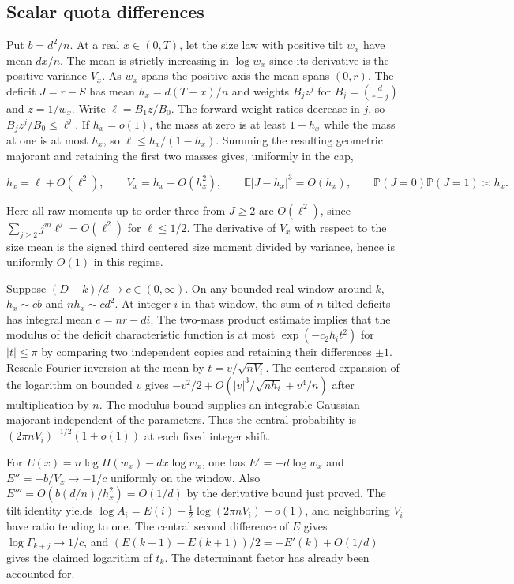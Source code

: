 \subsection{Scalar quota differences}

Put $b=d^2/n$. At a real $x\in(0,T)$, let the size law with positive tilt $w_x$ have mean $dx/n$. The mean is strictly increasing in $\log w_x$ since its derivative is the positive variance $V_x$. As $w_x$ spans the positive axis the mean spans $(0,r)$. The deficit $J=r-S$ has mean $h_x=d(T-x)/n$ and weights $B_j z^j$ for $B_j=\binom d{r-j}$ and $z=1/w_x$. Write $\ell=B_1z/B_0$. The forward weight ratios decrease in $j$, so $B_j z^j/B_0\le\ell^j$. If $h_x=o(1)$, the mass at zero is at least $1-h_x$ while the mass at one is at most $h_x$, so $\ell\le h_x/(1-h_x)$. Summing the resulting geometric majorant and retaining the first two masses gives, uniformly in the cap,

\begin{equation*}
h_x=\ell+O(\ell^2),\qquad
V_x=h_x+O(h_x^2),\qquad
\mathbb E|J-h_x|^3=O(h_x),\qquad
\mathbb P(J=0)\mathbb P(J=1)\asymp h_x.
\end{equation*}

Here all raw moments up to order three from $J\ge2$ are $O(\ell^2)$, since $\sum_{j\ge2}j^m\ell^j=O(\ell^2)$ for $\ell\le1/2$. The derivative of $V_x$ with respect to the size mean is the signed third centered size moment divided by variance, hence is uniformly $O(1)$ in this regime.

Suppose $(D-k)/d\to c\in(0,\infty)$. On any bounded real window around $k$, $h_x\sim cb$ and $nh_x\sim cd^2$. At integer $i$ in that window, the sum of $n$ tilted deficits has integral mean $e=nr-di$. The two-mass product estimate implies that the modulus of the deficit characteristic function is at most $\exp(-c_2h_i t^2)$ for $|t|\le\pi$ by comparing two independent copies and retaining their differences $\pm1$. Rescale Fourier inversion at the mean by $t=v/\sqrt{nV_i}$. The centered expansion of the logarithm on bounded $v$ gives $-v^2/2+O(|v|^3/\sqrt{nh_i}+v^4/n)$ after multiplication by $n$. The modulus bound supplies an integrable Gaussian majorant independent of the parameters. Thus the central probability is $(2\pi nV_i)^{-1/2}(1+o(1))$ at each fixed integer shift.

For $E(x)=n\log H(w_x)-dx\log w_x$, one has $E'=-d\log w_x$ and $E''=-b/V_x\to-1/c$ uniformly on the window. Also $E'''=O(b(d/n)/h_x^2)=O(1/d)$ by the derivative bound just proved. The tilt identity yields $\log A_i=E(i)-\tfrac12\log(2\pi nV_i)+o(1)$, and neighboring $V_i$ have ratio tending to one. The central second difference of $E$ gives $\log\Gamma_{k+j}\to1/c$, and $(E(k-1)-E(k+1))/2=-E'(k)+O(1/d)$ gives the claimed logarithm of $t_k$. The determinant factor has already been accounted for.

